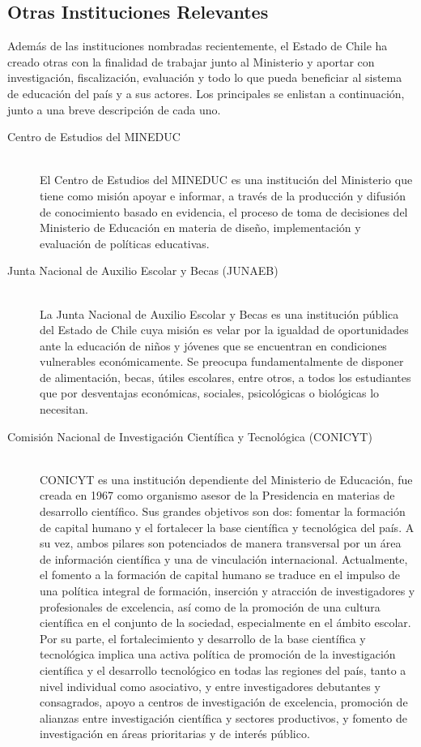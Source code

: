 \subsection{Otras Instituciones Relevantes}
Además de las instituciones nombradas recientemente, el Estado de Chile ha creado otras con la finalidad de trabajar junto al Ministerio y aportar con investigación, fiscalización, evaluación y todo lo que pueda beneficiar al sistema de educación del país y a sus actores. Los principales se enlistan a continuación, junto a una breve descripción de cada uno.

\begin{description}
\item[Centro de Estudios del MINEDUC] \hfill \\
El Centro de Estudios del MINEDUC es una institución del Ministerio que tiene como misión apoyar e informar, a través de la producción y difusión de conocimiento basado en evidencia, el proceso de toma de decisiones del Ministerio de Educación en materia de diseño, implementación y evaluación de políticas educativas. \cite{centroestudios}
\item[Junta Nacional de Auxilio Escolar y Becas (JUNAEB)] \hfill \\
La Junta Nacional de Auxilio Escolar y Becas es una institución pública del Estado de Chile cuya misión es velar por la igualdad de oportunidades ante la educación de niños y jóvenes que se encuentran en condiciones vulnerables económicamente. 
Se preocupa fundamentalmente de disponer de alimentación, becas, útiles escolares, entre otros, a todos los estudiantes que por desventajas económicas, sociales, psicológicas o biológicas lo necesitan. \cite{junaeb}
\item[Comisión Nacional de Investigación Científica y Tecnológica (CONICYT)] \hfill \\
CONICYT es una institución dependiente del Ministerio de Educación, fue creada en 1967 como organismo asesor de la Presidencia en materias de desarrollo científico. Sus grandes objetivos son dos: fomentar la formación de capital humano y el fortalecer la base científica y tecnológica del país. A su vez, ambos pilares son potenciados de manera transversal por un área de información científica y una de vinculación internacional. 
 Actualmente, el fomento a la formación de capital humano se traduce en el impulso de una política integral de formación, inserción y atracción de investigadores y profesionales de excelencia, así como de la promoción de una cultura científica en el conjunto de la sociedad, especialmente en el ámbito escolar. Por su parte, el fortalecimiento y desarrollo de la base científica y tecnológica implica una activa política de promoción de la investigación científica y el desarrollo tecnológico en todas las regiones del país, tanto a nivel individual como asociativo, y entre investigadores debutantes y consagrados, apoyo a centros de investigación de excelencia, promoción de alianzas entre investigación científica y sectores productivos, y fomento de investigación en áreas prioritarias y de interés público. \cite{conicyt}

\end{description}
